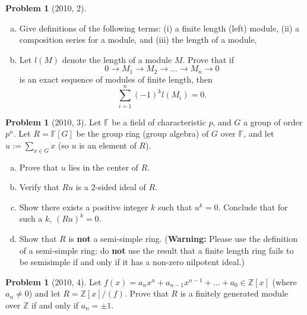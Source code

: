 \documentclass{article}
\newcommand{\<}{\langle} %
\renewcommand{\>}{\rangle} %
\theoremstyle{plain}
\theoremstyle{remark}
\theoremstyle{definition}
\newtheorem{examproblem}[equation]{Problem}
\begin{document}
\begin{examproblem}[2010, 2]
	\begin{enumerate}[(a)]
		\item Give definitions of the following terms:
			(i) a finite length (left) module, (ii) a
			composition series for a module, and (iii) the length
			of a module,
		\item Let $l(M)$ denote the length of a module $M$. Prove that if
			$$
			0\rightarrow M_1\rightarrow M_2\rightarrow\dots\rightarrow
			M_n\rightarrow 0
			$$
			is an exact sequence of modules of finite length, then
			$$
			\sum_{i=1}^n(-1)^kl(M_i)=0.
			$$
	\end{enumerate}
\end{examproblem}

\begin{examproblem}[2010, 3]
	Let $\mathbb F$ be a field of characteristic $p$, and $G$ a group of
	order $p^n$. Let $R=\mathbb F[G]$ be the group ring (group algebra)
	of $G$ over $\mathbb F$, and let $u:=\sum_{x\in G}x$ (so $u$ is an element of
	$R$).
	\begin{enumerate}[(a)]
		\item Prove that $u$ lies in the center of $R$.
		\item Verify that $Ru$ is a 2-sided ideal of $R$.
		\item Show there exists a positive integer $k$ such that $u^k=0$.
			Conclude that for such a $k$, $(Ru)^k=0$.
		\item Show that $R$ is \textbf{not} a semi-simple ring.
			(\textbf{Warning:} Please use the definition of a semi-simple
			ring: do \textbf{not} use the result that a finite length
			ring fails to be semisimple if and only if it has a non-zero
			nilpotent ideal.)
	\end{enumerate}
\end{examproblem}


\begin{examproblem}[2010, 4]
	Let $f(x)=a_nx^n+a_{n-1}x^{n-1}+\dots+a_0\in\mathbb Z[x]$
	(where $a_n\neq 0$) and let $R=\mathbb Z[x]/(f)$.
	Prove that $R$ is a finitely generated module over $\mathbb Z$ if and only if
	$a_n=\pm 1$.
\end{examproblem}
\end{document}
